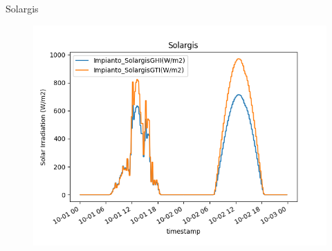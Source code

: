 \begin{frame}{Solargis}
    \begin{figure}
        \centering
        \includegraphics[width=.9\textwidth]{sections/1_dataset/imgs/solargis.png}
    \end{figure}
\end{frame}
